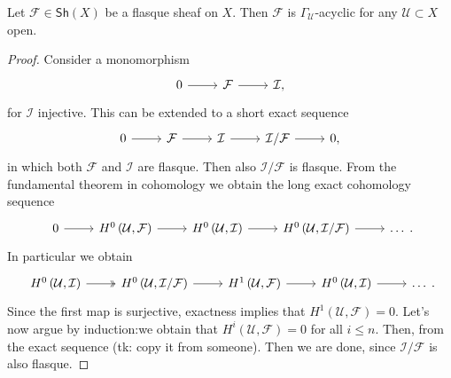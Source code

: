 \documentclass[../Main]{subfiles}
\begin{document}
\begin{prop}[]
	Let $\mathcal{F} \in \mathsf{Sh}\left(X\right)$ be a flasque sheaf on $X$.
	Then $\mathcal{F}$ is $\Gamma_{\mathcal{U}}$-acyclic for any $\mathcal{U}\subset X$ open.
\end{prop}
\begin{proof}
	Consider a monomorphism
	\begin{equation}
	\begin{tikzcd}
		0 \arrow[r, "", rightarrow] &
		\mathcal{F} \arrow[r, "", rightarrow] &
		\mathcal{I},
	\end{tikzcd}
	\end{equation} 
	for $\mathcal{I}$ injective.
	This can be extended to a short exact sequence
	\begin{equation}
	\begin{tikzcd}
		0 \arrow[r, "", rightarrow] &
		\mathcal{F} \arrow[r, "", rightarrow] &
		\mathcal{I} \arrow[r, "", rightarrow] &
		\mathcal{I}/\mathcal{F} \arrow[r, "", rightarrow] &
		0,
	\end{tikzcd}
	\end{equation} 
	in which both $\mathcal{F}$ and $\mathcal{I}$ are flasque.
	Then also $\mathcal{I}/\mathcal{F}$ is flasque.
	From the fundamental theorem in cohomology we obtain the long exact cohomology sequence
	\begin{equation}
	\begin{tikzcd}
		0 \arrow[r, "", rightarrow] &
		H^{0} \left( \mathcal{U}, \mathcal{F} \right) \arrow[r, "", rightarrow] &
		H^{0} \left( \mathcal{U}, \mathcal{I} \right) \arrow[r, "", rightarrow] &
		H^{0} \left( \mathcal{U}, \mathcal{I}/\mathcal{F} \right) \arrow[r, "", rightarrow] &
		\ldots
	\end{tikzcd}
	.\end{equation} 
	In particular we obtain
	\begin{equation}
	\begin{tikzcd}
		H^{0} \left( \mathcal{U}, \mathcal{I} \right) \arrow[r, "", twoheadrightarrow] &
		H^{0} \left( \mathcal{U}, \mathcal{I}/\mathcal{F} \right) \arrow[r, "", rightarrow] &
		H^{1} \left( \mathcal{U}, \mathcal{F} \right) \arrow[r, "", rightarrow] &
		H^{0} \left( \mathcal{U}, \mathcal{I} \right) \arrow[r, "", rightarrow] &
		\ldots
	\end{tikzcd}
	.\end{equation} 
	Since the first map is surjective,
	exactness implies that $H^{1} \left( \mathcal{U}, \mathcal{F} \right) = 0$.
	Let's now argue by induction:we obtain that $H^{i} \left( \mathcal{U}, \mathcal{F} \right) = 0$
	for all $i \leq n$.
	Then, from the exact sequence (tk: copy it from someone).
	Then we are done, since $\mathcal{I}/\mathcal{F}$ is also flasque.
\end{proof}
\end{document}
